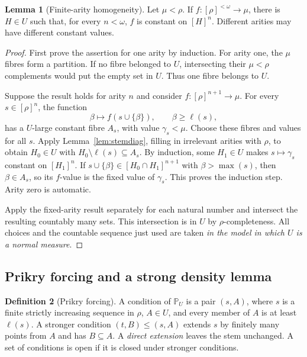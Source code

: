\documentclass[11pt,letterpaper]{article}
\theoremstyle{definition}
\newtheorem{definition}{Definition}[section]
\newtheorem{lemma}[definition]{Lemma}
\newcommand{\PP}{\mathbb P}
\begin{document}
\begin{lemma}[Finite-arity homogeneity]\label{lem:rowbottom}
Let $\mu<\rho$. If $f:[\rho]^{<\omega}\to\mu$, there is $H\in U$ such that, for every $n<\omega$, $f$ is constant on $[H]^n$. Different arities may have different constant values.
\end{lemma}

\begin{proof}
First prove the assertion for one arity by induction. For arity one, the $\mu$ fibres form a partition. If no fibre belonged to $U$, intersecting their $\mu<\rho$ complements would put the empty set in $U$. Thus one fibre belongs to $U$.

Suppose the result holds for arity $n$ and consider $f:[\rho]^{n+1}\to\mu$. For every $s\in[\rho]^n$, the function
\[
             \beta\longmapsto f(s\cup\{\beta\}),\qquad \beta\ge\ell(s),
\]
has a $U$-large constant fibre $A_s$, with value $\gamma_s<\mu$. Choose these fibres and values for all $s$. Apply Lemma~\ref{lem:stemdiag}, filling in irrelevant arities with $\rho$, to obtain $H_0\in U$ with $H_0\setminus\ell(s)\subseteq A_s$. By induction, some $H_1\in U$ makes $s\mapsto\gamma_s$ constant on $[H_1]^n$. If $s\cup\{\beta\}\in[H_0\cap H_1]^{n+1}$ with $\beta>\max(s)$, then $\beta\in A_s$, so its $f$-value is the fixed value of $\gamma_s$. This proves the induction step. Arity zero is automatic.

Apply the fixed-arity result separately for each natural number and intersect the resulting countably many sets. This intersection is in $U$ by $\rho$-completeness. All choices and the countable sequence just used are taken \emph{in the model in which $U$ is a normal measure}.
\end{proof}

\subsection{Prikry forcing and a strong density lemma}

\begin{definition}[Prikry forcing]\label{def:prikry}
A condition of $\PP_U$ is a pair $(s,A)$, where $s$ is a finite strictly increasing sequence in $\rho$, $A\in U$, and every member of $A$ is at least $\ell(s)$. A stronger condition $(t,B)\le(s,A)$ extends $s$ by finitely many points from $A$ and has $B\subseteq A$. A \emph{direct extension} leaves the stem unchanged. A set of conditions is open if it is closed under stronger conditions.
\end{definition}
\end{document}
